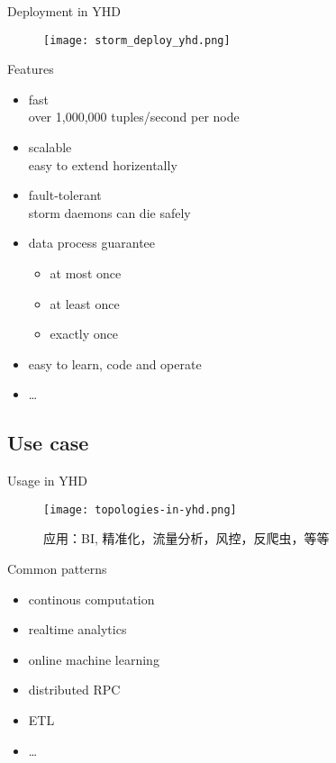 \documentclass{beamer}
\begin{document}
\begin{frame}{Deployment in YHD}
  \begin{figure}
    \centering
    \texttt{[image: storm\_deploy\_yhd.png]}
  \end{figure}
\end{frame}
\begin{frame}{Features}
  \begin{itemize}
    \item fast \\
      over 1,000,000 tuples/second per node
    \item scalable \\
      easy to extend horizentally
    \item fault-tolerant\\
      storm daemons can die safely
    \item data process guarantee\\
      \begin{itemize}
	\item at most once
	\item at least once
	\item exactly once
      \end{itemize}
    \item easy to learn, code and operate
    \item \ldots
  \end{itemize}
\end{frame}

\subsection{Use case}
\begin{frame}{Usage in YHD}
  \begin{figure}
    \centering
    \texttt{[image: topologies-in-yhd.png]}
    \caption{应用：BI, 精准化，流量分析，风控，反爬虫，等等}
  \end{figure}
\end{frame}
\begin{frame}{Common patterns}
  \begin{itemize}
    \item continous computation
    \item realtime analytics
    \item online machine learning
    \item distributed RPC
    \item ETL
    \item \ldots
  \end{itemize}
\end{frame}
\end{document}
